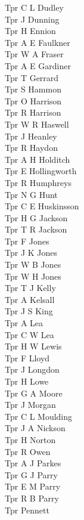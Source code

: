 \begin{multicols}{3}
  Tpr C L Dudley \\
  Tpr J Dunning \\
  Tpr H Ennion \\
  Tpr A E Faulkner \\
  Tpr W A Fraser \\
  Tpr A E Gardiner \\
  Tpr T Gerrard \\
  Tpr S Hammon \\
  Tpr O Harrison \\
  Tpr R Harrison \\
  Tpr W R Haswell \\
  Tpr J Heanley \\
  Tpr R Haydon \\
  Tpr A H Holditch \\
  Tpr E Hollingworth \\
  Tpr R Humphreys \\
  Tpr N G Hunt \\
  Tpr C E Huskinsson \\
  Tpr H G Jackson \\
  Tpr T R Jackson \\
  Tpr F Jones \\
  Tpr J K Jones \\
  Tpr W B Jones \\
  Tpr W H Jones \\
  Tpr T J Kelly \\
  Tpr A Kelsall \\
  Tpr J S King \\
  Tpr A Lea \\
  Tpr C W Lea \\
  Tpr H W Lewis \\
  Tpr F Lloyd \\
  Tpr J Longdon \\
  Tpr H Lowe \\
  Tpr G A Moore \\
  Tpr J Morgan \\
  Tpr C L Moulding \\
  Tpr J A Nickson \\
  Tpr H Norton \\
  Tpr R Owen \\
  Tpr A J Parkes \\
  Tpr G J Parry \\
  Tpr E M Parry \\
  Tpr R B Parry \\
  Tpr Pennett \\

\end{multicols}
